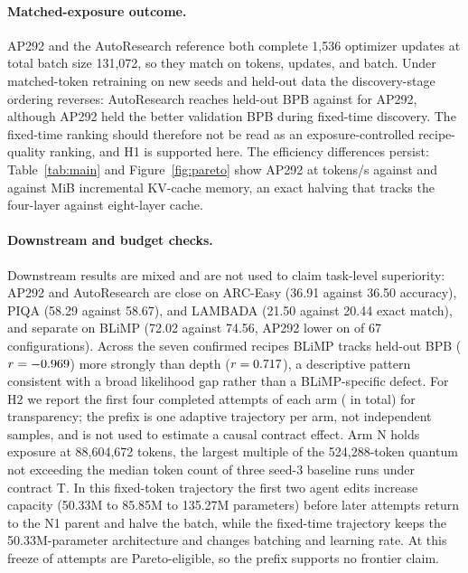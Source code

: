 \documentclass{article}
\begin{document}
\paragraph{Matched-exposure outcome.} AP292 and the AutoResearch reference both complete 1,536 optimizer updates at total batch size 131,072, so they match on tokens, updates, and batch. Under matched-token retraining on new seeds and held-out data the discovery-stage ordering reverses: AutoResearch reaches held-out BPB \ARBPB{} against \APBPB{} for AP292, although AP292 held the better validation BPB during fixed-time discovery. The fixed-time ranking should therefore not be read as an exposure-controlled recipe-quality ranking, and H1 is supported here. The efficiency differences persist: Table~\ref{tab:main} and Figure~\ref{fig:pareto} show AP292 at \APSpeed{} tokens/s against \ARSpeed{} and \APKV{} against \ARKV{} MiB incremental KV-cache memory, an exact halving that tracks the four-layer against eight-layer cache.

\paragraph{Downstream and budget checks.} Downstream results are mixed and are not used to claim task-level superiority: AP292 and AutoResearch are close on ARC-Easy (36.91 against 36.50 accuracy), PIQA (58.29 against 58.67), and LAMBADA (21.50 against 20.44 exact match), and separate on BLiMP (72.02 against 74.56, AP292 lower on \BLiMPLower{} of 67 configurations). Across the seven confirmed recipes BLiMP tracks held-out BPB ($r=-0.969$) more strongly than depth ($r=0.717$), a descriptive pattern consistent with a broad likelihood gap rather than a BLiMP-specific defect. For H2 we report the first four completed attempts of each arm (\BudgetN{} in total) for transparency; the prefix is one adaptive trajectory per arm, not \BudgetN{} independent samples, and is not used to estimate a causal contract effect. Arm N holds exposure at 88,604,672 tokens, the largest multiple of the 524,288-token quantum not exceeding the median token count of three seed-3 baseline runs under contract T. In this fixed-token trajectory the first two agent edits increase capacity (50.33M to 85.85M to 135.27M parameters) before later attempts return to the N1 parent and halve the batch, while the fixed-time trajectory keeps the 50.33M-parameter architecture and changes batching and learning rate. At this freeze \BudgetParetoN{} of \BudgetN{} attempts are Pareto-eligible, so the prefix supports no frontier claim.
\end{document}
